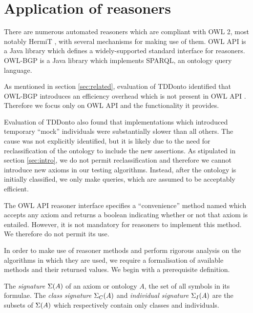 \documentclass[paper.tex]{subfiles}
\begin{document}
\section{Application of reasoners}
\label{sec:reasoners}

There are numerous automated reasoners which are compliant with OWL 2, most notably HermiT \cite{Glimm:HermiT}, with several mechanisms for making use of them.  OWL API \cite{OWLAPI} is a Java library which defines a widely-supported standard interface for reasoners.  OWL-BGP \cite{OWLBGP} is a Java library which implements SPARQL, an ontology query language.

As mentioned in section \ref{sec:related}, evaluation of TDDonto identified that OWL-BGP introduces an efficiency overhead which is not present in OWL API \cite{Lawrynowicz:TDDontoTool}.  Therefore we focus only on OWL API and the functionality it provides.

Evaluation of TDDonto also found that implementations which introduced temporary ``mock'' individuals were substantially slower than all others.  The cause was not explicitly identified, but it is likely due to the need for reclassification of the ontology to include the new assertions.  As stipulated in section \ref{sec:intro}, we do not permit reclassification and therefore we cannot introduce new axioms in our testing algorithms.  Instead, after the ontology is initially classified, we only make queries, which are assumed to be acceptably efficient.

The OWL API reasoner interface specifies a ``convenience'' method named  which accepts any axiom and returns a boolean indicating whether or not that axiom is entailed.  However, it is not mandatory for reasoners to implement this method.  We therefore do not permit its use.

In order to make use of reasoner methods and perform rigorous analysis on the algorithms in which they are used, we require a formalisation of available methods and their returned values.  We begin with a prerequisite definition.

\begin{definition}
  The \emph{signature} $\Sigma(A)$ of an axiom or ontology $A$, the set of all symbols in its formulae.  The \emph{class signature} $\Sigma_C(A)$ and \emph{individual signature} $\Sigma_I(A)$ are the subsets of $\Sigma(A)$ which respectively contain only classes and individuals.
\end{definition}
\end{document}
